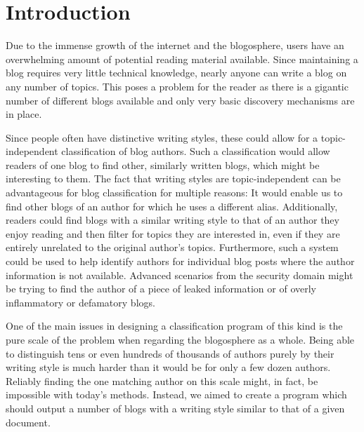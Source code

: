 
\section{Introduction}
\label{sec:introduction}


Due to the immense growth of the internet and the blogosphere, users have an overwhelming amount of potential reading material available.
Since maintaining a blog requires very little technical knowledge, nearly anyone can write a blog on any number of topics.
This poses a problem for the reader as there is a gigantic number of different blogs available and only very basic discovery mechanisms are in place.


Since people often have distinctive writing styles, these could allow for a topic-independent classification of blog authors.
Such a classification would allow readers of one blog to find other, similarly written blogs, which might be interesting to them.
The fact that writing styles are topic-independent can be advantageous for blog classification for multiple reasons: It would enable us to find other blogs of an author for which he uses a different alias.
Additionally, readers could find blogs with a similar writing style to that of an author they enjoy reading and then filter for topics they are interested in, even if they are entirely unrelated to the original author's topics.
Furthermore, such a system could be used to help identify authors for individual blog posts where the author information is not available.
Advanced scenarios from the security domain might be trying to find the author of a piece of leaked information or of overly inflammatory or defamatory blogs.


One of the main issues in designing a classification program of this kind is the pure scale of the problem when regarding the blogosphere as a whole.
Being able to distinguish tens or even hundreds of thousands of authors purely by their writing style is much harder than it would be for only a few dozen authors.
Reliably finding the one matching author on this scale might, in fact, be impossible with today's methods.
Instead, we aimed to create a program which should output a number of blogs with a writing style similar to that of a given document.

